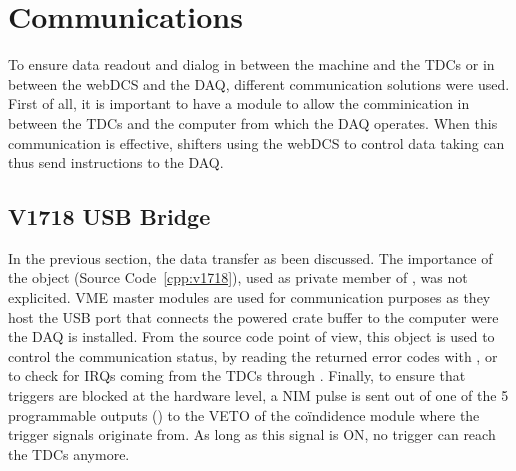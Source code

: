 \section{Communications}
\label{app1:sec:Comm}

	To ensure data readout and dialog in between the machine and the TDCs or in between the webDCS and the DAQ, different communication solutions were used. First of all, it is important to have a module to allow the comminication in between the TDCs and the computer from which the DAQ operates. When this communication is effective, shifters using the webDCS to control data taking can thus send instructions to the DAQ.\\

    \subsection{V1718 USB Bridge}
    \label{app1:ssec:V1718}
    
    In the previous section, the data transfer as been discussed. The importance of the  object (Source Code~\ref{cpp:v1718}), used as private member of , was not explicited. VME  master modules are used for communication purposes as they host the USB port that connects the powered crate buffer to the computer were the DAQ is installed. From the source code point of view, this object is used to control the communication status, by reading the returned error codes with , or to check for IRQs coming from the TDCs through . Finally, to ensure that triggers are blocked at the hardware level, a NIM pulse is sent out of one of the 5 programmable outputs () to the VETO of the coïndidence module where the trigger signals originate from. As long as this signal is ON, no trigger can reach the TDCs anymore.\\
	

